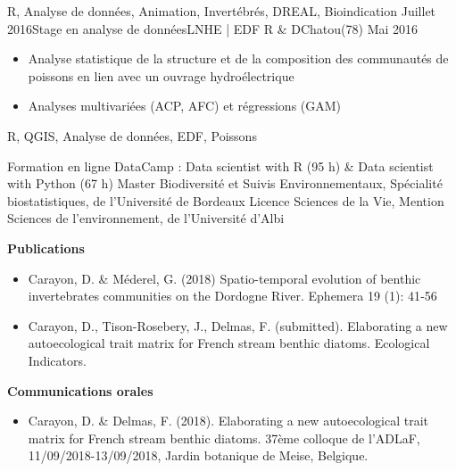 \documentclass[localFont,alternative]{yaac-another-awesome-cv}
\begin{document}
\begin{experiences}
{\begin{itemize}
                      \end{itemize}
                    }
                    {R, Analyse de données, Animation, Invertébrés, DREAL, Bioindication}
  \emptySeparator
  \experience
    {Juillet 2016}{Stage en analyse de données}{LNHE | EDF R \& D}{Chatou(78)}
    {Mai 2016}    {
                      \begin{itemize}
                        \item Analyse statistique de la structure et de la composition des communautés de poissons en lien avec un ouvrage hydroélectrique
                        \item Analyses multivariées (ACP, AFC) et régressions (GAM)         
                      \end{itemize}
                    }
                    {R, QGIS,  Analyse de données, EDF, Poissons}
  \emptySeparator
  
\end{experiences}


\begin{scholarship}

					{Formation en ligne DataCamp : Data scientist with R (95 h) \& Data scientist with Python (67 h)}
					{Master Biodiversité et Suivis Environnementaux, Spécialité biostatistiques, de l'Université de Bordeaux}
					{Licence Sciences de la Vie, Mention Sciences de l'environnement, de l'Université d'Albi}
\end{scholarship}


\textbf{Publications}
\begin{itemize}
\item Carayon, D. \& Méderel, G. (2018) Spatio-temporal evolution of benthic invertebrates communities on the Dordogne River. Ephemera 19 (1): 41‑56
\\
\item Carayon, D., Tison-Rosebery, J., Delmas, F. (submitted). Elaborating a new autoecological trait matrix for French stream benthic diatoms. Ecological Indicators.

\end{itemize}

\textbf{Communications orales}
\begin{itemize}
\item Carayon, D. \& Delmas, F. (2018). Elaborating a new autoecological trait matrix for French stream benthic diatoms. 37ème colloque de l’ADLaF, 11/09/2018-13/09/2018, Jardin botanique de Meise, Belgique.
\end{itemize}
\end{document}
